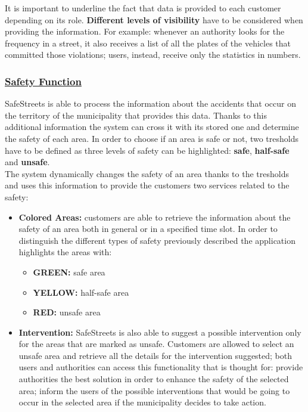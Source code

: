 	It is important to underline the fact that data is provided to each customer depending on its role. \textbf{Different levels of visibility} have to be considered when providing the information. For example: whenever an authority looks for the frequency in a street, it also receives a list of all the plates of the vehicles that committed those violations; users, instead, receive only the statistics in numbers. 
	
	\subsubsection[Safety Function]{\hyperlink{toc}{Safety Function}}
		SafeStreets is able to process the information about the accidents that occur on the territory of the municipality that provides this data. Thanks to this additional information the system can cross it with its stored one and determine the safety of each area. In order to choose if an area is safe or not, two tresholds have to be defined as three levels of safety can be highlighted: \textbf{safe}, \textbf{half-safe} and \textbf{unsafe}.\\
		
		The system dynamically changes the safety of an area thanks to the tresholds and uses this information to provide the customers two services related to the safety:
		
		\begin{itemize}
			\item \textbf{Colored Areas:} customers are able to retrieve the information about the safety of an area both in general or in a specified time slot. In order to distinguish the different types of safety previously described the application highlights the areas with:
			\begin{itemize}
				\item \textbf{GREEN:} safe area
				\item \textbf{YELLOW:} half-safe area
				\item \textbf{RED:} unsafe area
			\end{itemize} 
		
			\item \textbf{Intervention:} SafeStreets is also able to suggest a possible intervention only for the areas that are marked as unsafe. Customers are allowed to select an unsafe area and retrieve all the details for the intervention suggested; both users and authorities can access this functionality that is thought for: provide authorities the best solution in order to enhance the safety of the selected area; inform the users of the possible interventions that would be going to occur in the selected area if the municipality decides to take action.
		\end{itemize}
		
